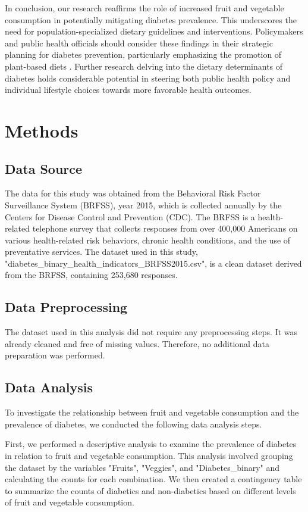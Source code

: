 \documentclass[11pt]{article}
\begin{document}
In conclusion, our research reaffirms the role of increased fruit and vegetable consumption in potentially mitigating diabetes prevalence. This underscores the need for population-specialized dietary guidelines and interventions. Policymakers and public health officials should consider these findings in their strategic planning for diabetes prevention, particularly emphasizing the promotion of plant-based diets \cite{Jardim2019CardiometabolicDC}. Further research delving into the dietary determinants of diabetes holds considerable potential in steering both public health policy and individual lifestyle choices towards more favorable health outcomes.

\section*{Methods}

\subsection*{Data Source}
The data for this study was obtained from the Behavioral Risk Factor Surveillance System (BRFSS), year 2015, which is collected annually by the Centers for Disease Control and Prevention (CDC). The BRFSS is a health-related telephone survey that collects responses from over 400,000 Americans on various health-related risk behaviors, chronic health conditions, and the use of preventative services. The dataset used in this study, "diabetes\_binary\_health\_indicators\_BRFSS2015.csv", is a clean dataset derived from the BRFSS, containing 253,680 responses.

\subsection*{Data Preprocessing}
The dataset used in this analysis did not require any preprocessing steps. It was already cleaned and free of missing values. Therefore, no additional data preparation was performed.

\subsection*{Data Analysis}
To investigate the relationship between fruit and vegetable consumption and the prevalence of diabetes, we conducted the following data analysis steps.

First, we performed a descriptive analysis to examine the prevalence of diabetes in relation to fruit and vegetable consumption. This analysis involved grouping the dataset by the variables "Fruits", "Veggies", and "Diabetes\_binary" and calculating the counts for each combination. We then created a contingency table to summarize the counts of diabetics and non-diabetics based on different levels of fruit and vegetable consumption.
\end{document}
